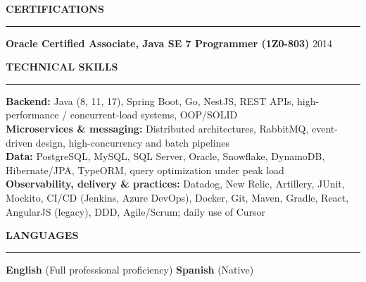 \documentclass[11pt]{article}
\begin{document}
\vspace{20pt}

{\large \textbf{CERTIFICATIONS}}\\[3pt]
\hrule
\vspace{3pt}

\textbf{Oracle Certified Associate, Java SE 7 Programmer (1Z0-803)} \hfill 2014

\vspace{20pt}

\enlargethispage{3\baselineskip}

{\large \textbf{TECHNICAL SKILLS}}\\[3pt]
\hrule
\vspace{3pt}

\textbf{Backend:} Java (8, 11, 17), Spring Boot, Go, NestJS, REST APIs, high-performance / concurrent-load systems, OOP/SOLID \\
\textbf{Microservices \& messaging:} Distributed architectures, RabbitMQ, event-driven design, high-concurrency and batch pipelines \\
\textbf{Data:} PostgreSQL, MySQL, SQL Server, Oracle, Snowflake, DynamoDB, Hibernate/JPA, TypeORM, query optimization under peak load \\
\textbf{Observability, delivery \& practices:} Datadog, New Relic, Artillery, JUnit, Mockito, CI/CD (Jenkins, Azure DevOps), Docker, Git, Maven, Gradle, React, AngularJS (legacy), DDD, Agile/Scrum; daily use of Cursor

\vspace{6pt}

{\large \textbf{LANGUAGES}}\\[3pt]
\hrule
\vspace{3pt}

\textbf{English} (Full professional proficiency) \quad \textbf{Spanish} (Native)
\end{document}
